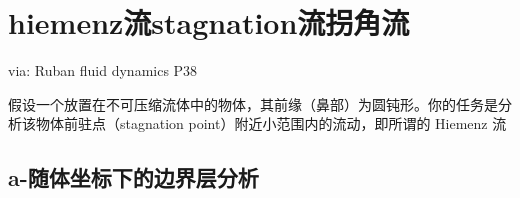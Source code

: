 
\section{hiemenz流stagnation流拐角流}
via: Ruban fluid dynamics P38

假设一个放置在不可压缩流体中的物体，其前缘（鼻部）为圆钝形。你的任务是分析该物体前驻点（stagnation point）附近小范围内的流动，即所谓的 Hiemenz 流

\subsection{a-随体坐标下的边界层分析}

